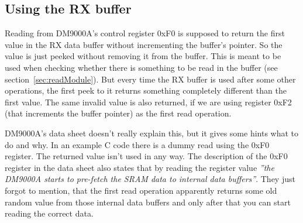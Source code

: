 \documentclass{article}
\begin{document}
\subsection{Using the RX buffer} \label{sec:peekingFail}

Reading from DM9000A's control register 0xF0 is supposed to return the
first value in the RX data buffer without incrementing the buffer's
pointer. So the value is just peeked without removing it from the
buffer. This is meant to be used when checking whether there is
something to be read in the buffer (see section~\ref{sec:readModule}).
But every time the RX buffer is used after some other operations, the
first peek to it returns something completely different than the first
value. The same invalid value is also returned, if we are using
register 0xF2 (that increments the buffer pointer) as the first read
operation.

DM9000A's data sheet doesn't really explain this, but it gives some
hints what to do and why. In an example C code there is a dummy read
using the 0xF0 register. The returned value isn't used in any way. The
description of the 0xF0 register in the data sheet also states that by
reading the register value \emph{''the DM9000A starts to pre-fetch the
  SRAM data to internal data buffers''}. They just forgot to mention,
that the first read operation apparently returns some old random value
from those internal data buffers and only after that you can start
reading the correct data.
\end{document}
